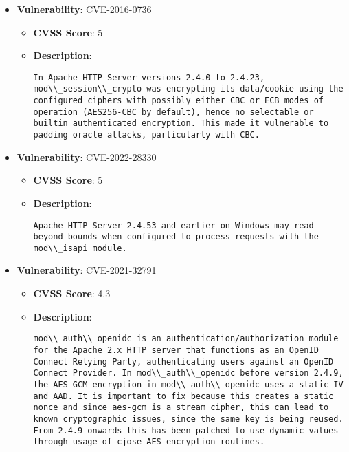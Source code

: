 \documentclass{article}
\begin{document}
\begin{itemize}
        \item \textbf{Vulnerability}: CVE-2016-0736
        \begin{itemize}
            \item \textbf{CVSS Score}:  5 
            \item \textbf{Description}:
            \parbox[t]{0.9\linewidth}{
                \verb|In Apache HTTP Server versions 2.4.0 to 2.4.23, mod\\_session\\_crypto was encrypting its data/cookie using the configured ciphers with possibly either CBC or ECB modes of operation (AES256-CBC by default), hence no selectable or builtin authenticated encryption. This made it vulnerable to padding oracle attacks, particularly with CBC.|
            }
        \end{itemize}
    
        \item \textbf{Vulnerability}: CVE-2022-28330
        \begin{itemize}
            \item \textbf{CVSS Score}:  5 
            \item \textbf{Description}:
            \parbox[t]{0.9\linewidth}{
                \verb|Apache HTTP Server 2.4.53 and earlier on Windows may read beyond bounds when configured to process requests with the mod\\_isapi module.|
            }
        \end{itemize}
    
        \item \textbf{Vulnerability}: CVE-2021-32791
        \begin{itemize}
            \item \textbf{CVSS Score}:  4.3 
            \item \textbf{Description}:
            \parbox[t]{0.9\linewidth}{
                \verb|mod\\_auth\\_openidc is an authentication/authorization module for the Apache 2.x HTTP server that functions as an OpenID Connect Relying Party, authenticating users against an OpenID Connect Provider. In mod\\_auth\\_openidc before version 2.4.9, the AES GCM encryption in mod\\_auth\\_openidc uses a static IV and AAD. It is important to fix because this creates a static nonce and since aes-gcm is a stream cipher, this can lead to known cryptographic issues, since the same key is being reused. From 2.4.9 onwards this has been patched to use dynamic values through usage of cjose AES encryption routines.|
            }
        \end{itemize}
    

\end{itemize}
\end{document}

